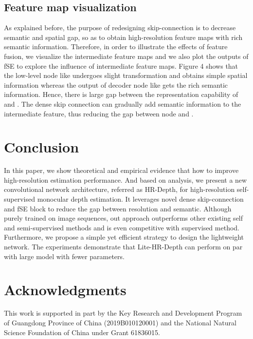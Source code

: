 \documentclass[letterpaper]{article} \usepackage{aaai21}  \usepackage{times}  \usepackage{helvet} \usepackage{courier}  \usepackage[hyphens]{url}  \usepackage{graphicx} \urlstyle{rm} \def\UrlFont{\rm}  \usepackage{natbib}  \usepackage{caption} \frenchspacing  \setlength{\pdfpagewidth}{8.5in}  \setlength{\pdfpageheight}{11in}  \usepackage{booktabs}
\begin{document}
\subsection{Feature map visualization}
As explained before, the purpose of redesigning skip-connection is to decrease semantic and spatial gap, so as to obtain high-resolution feature maps with rich semantic information. Therefore, in order to illustrate
the effects of feature fusion, we visualize the intermediate feature maps and we also plot the outputs of fSE to explore the influence of intermediate feature maps. Figure 4 shows that the low-level node like  undergoes slight
transformation and obtains simple spatial information whereas the output of decoder node like  gets the rich semantic information. Hence, there is large gap between the representation capability of  and .
The dense skip connection can gradually add semantic information to the intermediate feature, thus reducing the gap between node  and . 

\section{Conclusion}
In this paper, we show theoretical and empirical evidence that how to improve high-resolution estimation performance. And based on analysis, we present a new convolutional network architecture, referred as HR-Depth, for high-resolution 
self-supervised monocular depth estimation. It leverages novel dense skip-connection and fSE block to reduce the gap between resolution and semantic. Although purely trained on image sequences, out approach outperforms other existing 
self and semi-supervised methods and is even competitive with supervised method. Furthermore, we propose a simple yet efficient strategy to design the lightweight network. The experiments demonstrate that Lite-HR-Depth can perform on
par with large model with fewer parameters.

\section{Acknowledgments}
This work is supported in part by the Key Research and Development Program of Guangdong Province of China (2019B010120001) and the National Natural Science Foundation of China under Grant 61836015.

\end{document}
